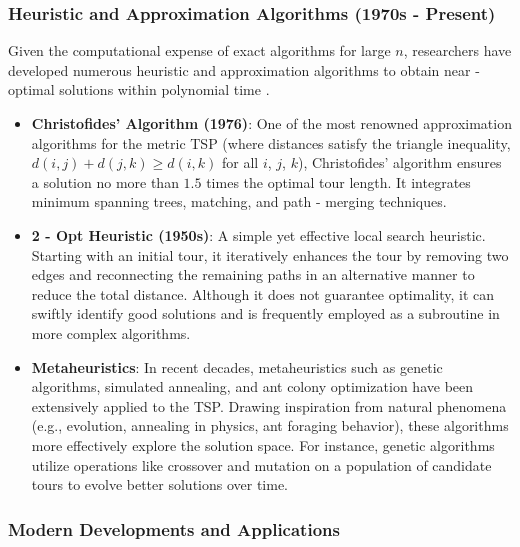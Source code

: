 \documentclass[acmsmall]{acmart}
\begin{document}
	\subsubsection{Heuristic and Approximation Algorithms (1970s - Present)}
	
	\hspace{1.2em}Given the computational expense of exact algorithms for large \(n\), researchers have developed numerous heuristic and approximation algorithms to obtain near - optimal solutions within polynomial time \cite{yilmaz2020analysis}.
	\begin{itemize}
		\item \textbf{Christofides' Algorithm (1976)}: One of the most renowned approximation algorithms for the metric TSP (where distances satisfy the triangle inequality, \(d(i, j)+d(j, k)\geq d(i, k)\) for all \(i\), \(j\), \(k\)), Christofides' algorithm ensures a solution no more than \(1.5\) times the optimal tour length\cite{christofides1976worst}. It integrates minimum spanning trees, matching, and path - merging techniques.
		
		\item \textbf{2 - Opt Heuristic (1950s)}: A simple yet effective local search heuristic. Starting with an initial tour, it iteratively enhances the tour by removing two edges and reconnecting the remaining paths in an alternative manner to reduce the total distance. Although it does not guarantee optimality, it can swiftly identify good solutions and is frequently employed as a subroutine in more complex algorithms.
		
		\item \textbf{Metaheuristics}: In recent decades, metaheuristics such as genetic algorithms, simulated annealing, and ant colony optimization have been extensively applied to the TSP. Drawing inspiration from natural phenomena (e.g., evolution, annealing in physics, ant foraging behavior), these algorithms more effectively explore the solution space. For instance, genetic algorithms utilize operations like crossover and mutation on a population of candidate tours to evolve better solutions over time.
	\end{itemize}
	
	\subsubsection{Modern Developments and Applications}
	
\end{document}
